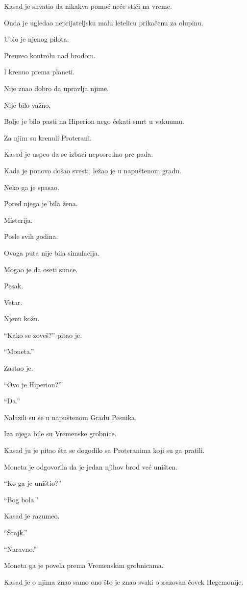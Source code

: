Kasad je shvatio da nikakva pomoć neće stići na vreme.

Onda je ugledao neprijateljsku malu letelicu prikačenu za olupinu.

Ubio je njenog pilota.

Preuzeo kontrolu nad brodom.

I krenuo prema planeti.

Nije znao dobro da upravlja njime.

Nije bilo važno.

Bolje je bilo pasti na Hiperion nego čekati smrt u vakuumu.

Za njim su krenuli Proterani.

Kasad je uspeo da se izbaci neposredno pre pada.

Kada je ponovo došao svesti, ležao je u napuštenom gradu.

Neko ga je spasao.

Pored njega je bila žena.

Misterija.

Posle svih godina.

Ovoga puta nije bila simulacija.

Mogao je da oseti sunce.

Pesak.

Vetar.

Njenu kožu.

``Kako se zoveš?'' pitao je.

``Moneta.''

Zastao je.

``Ovo je Hiperion?''

``Da.''

Nalazili su se u napuštenom Gradu Pesnika.

Iza njega bile su Vremenske grobnice.

Kasad ju je pitao šta se dogodilo sa Proteranima koji su ga pratili.

Moneta je odgovorila da je jedan njihov brod već uništen.

``Ko ga je uništio?''

``Bog bola.''

Kasad je razumeo.

``Šrajk.''

``Naravno.''

\bigskip

Moneta ga je povela prema Vremenskim grobnicama.

Kasad je o njima znao samo ono što je znao svaki obrazovan čovek Hegemonije.

